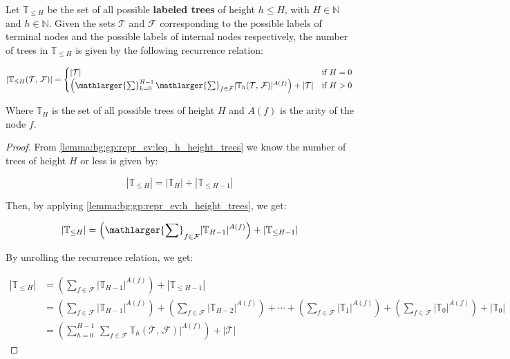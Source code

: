   \begin{theorem}
  \label{thm:bg:gp:repr_ev:leq_h_height_trees}
    Let \(\mathbb{T}_{\leq H}\) be the set of all possible \textbf{labeled 
    trees} of height \(h \leq H\), with \(H \in \mathbb{N}\) and \(h \in 
    \mathbb{N}\).
    Given the sets \(\mathcal{T}\) and \(\mathcal{F}\) corresponding to the
    possible labels of terminal nodes and the possible labels of internal nodes 
    respectively, the number of trees in \(\mathbb{T}_{\leq H}\) is given by the
    following recurrence relation:

    \begin{equation}
      |\mathbb{T}_{\leq H}(\mathcal{T},\, \mathcal{F})| = \begin{cases}
        |\mathcal{T}| 
          & \text{if } H = 0 \\
        \left(\mathlarger{\sum}_{h = 0}^{H - 1}\,
          \mathlarger{\sum}_{f \in \mathcal{F}} 
            |\mathbb{T}_{h}(\mathcal{T},\, \mathcal{F})|^{A(f)}\right)
          + |\mathcal{T}|
          & \text{if } H > 0
      \end{cases}
    \end{equation}

    Where \(\mathbb{T}_{H}\) is the set of all possible trees of height \(H\) 
    and \(A(f)\) is the arity of the node \(f\).
  \end{theorem}

  \begin{proof}
    From \vref{lemma:bg:gp:repr_ev:leq_h_height_trees} we
    know the number of trees of height \(H\) or less is given by:

    \[
      |\mathbb{T}_{\leq H}| = |\mathbb{T}_{H}| + |\mathbb{T}_{\leq H - 1}|
    \]

    Then, by applying 
    \vref{lemma:bg:gp:repr_ev:h_height_trees}, we get:

    \[
      |\mathbb{T}_{\leq H}| = \left(\mathlarger{\sum}_{f \in \mathcal{F}} 
        |\mathbb{T}_{H - 1}|^{A(f)}\right) + |\mathbb{T}_{\leq H - 1}|
    \]

    By unrolling the recurrence relation, we get:

    \begin{align*}
      |\mathbb{T}_{\leq H}| 
        &= \left(
            \sum_{f \in \mathcal{F}} |\mathbb{T}_{H - 1}|^{A(f)}
          \right) + |\mathbb{T}_{\leq H - 1}| \\
        &= \left(
            \sum_{f \in \mathcal{F}} |\mathbb{T}_{H - 1}|^{A(f)}
          \right) + \left(
            \sum_{f \in \mathcal{F}} |\mathbb{T}_{H - 2}|^{A(f)}
          \right) + \cdots + \left(
            \sum_{f \in \mathcal{F}} |\mathbb{T}_{1}|^{A(f)}
          \right) + \left(
            \sum_{f \in \mathcal{F}} |\mathbb{T}_{0}|^{A(f)}
          \right) + |\mathbb{T}_{0}| \\
        &= \left(
          \sum_{h = 0}^{H - 1}\,
            \sum_{f \in \mathcal{F}} 
              \mathbb{T}_{h}(\mathcal{T},\, \mathcal{F})|^{A(f)}
          \right) + |\mathcal{T}|
    \end{align*}
  \end{proof}

